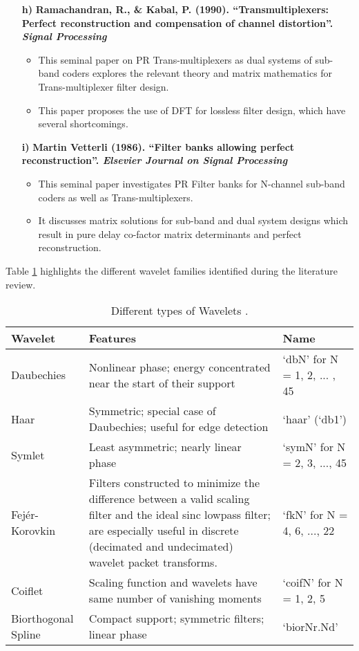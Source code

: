 \begin{enumerate}
\item[\textbf{h)}] \textbf{Ramachandran, R., \& Kabal, P. (1990). ``Transmultiplexers: Perfect reconstruction and compensation of channel distortion''. \textit{Signal Processing} \cite{b7}}
\begin{itemize}
    \item This seminal paper on PR Trans-multiplexers as dual systems of sub-band coders explores the relevant theory and matrix mathematics for Trans-multiplexer filter design.
    \item This paper proposes the use of DFT for lossless filter design, which have several shortcomings.
\end{itemize}
\item[\textbf{i)}] \textbf{Martin Vetterli (1986). ``Filter banks allowing perfect reconstruction''. \textit{Elsevier Journal on Signal Processing} \cite{b8}}
\begin{itemize}
    \item This seminal paper investigates PR Filter banks for N-channel sub-band coders as well as Trans-multiplexers.
    \item It discusses matrix solutions for sub-band and dual system designs which result in pure delay co-factor matrix determinants and perfect reconstruction.
\end{itemize}
\end{enumerate}

Table \ref{wlets} highlights the different wavelet families identified during the literature review.

\begin{table}[hptb]
\begin{center}
\begin{tabular}{ |p{2.5cm}|p{10cm}|p{3cm}| } 
 \hline
Wavelet & Features & Name \\ 
 \hline
Daubechies & Nonlinear phase; energy concentrated  near the start of their support & `dbN' for N = 1, 2, ... , 45 \\ 
 \hline
 Haar & Symmetric; special case of Daubechies; useful for edge detection & `haar' (`db1') \\ 
 \hline
 Symlet & Least asymmetric; nearly linear phase  &  `symN' for N = 2, 3, ..., 45 \\
 \hline
 Fejér-Korovkin & 	Filters constructed to minimize the difference between a valid scaling filter and the ideal sinc lowpass filter; are especially useful in discrete (decimated and undecimated) wavelet packet transforms. & `fkN' for N = 4, 6, ..., 22 \\ 
 \hline
 Coiflet & Scaling function and wavelets have same number of vanishing moments & `coifN' for N = 1, 2, 5 \\
 \hline
 Biorthogonal Spline & Compact support; symmetric filters; linear phase & `biorNr.Nd'  \\
 \hline
\end{tabular}
\caption{Different types of Wavelets \cite{mallat_book}.}
\label{wlets}
\end{center}
\end{table}


